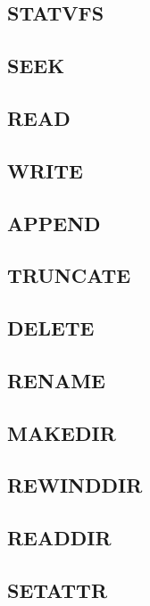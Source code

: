 \subsection{STATVFS}

\subsection{SEEK}

\subsection{READ}

\subsection{WRITE}

\subsection{APPEND}

\subsection{TRUNCATE}

\subsection{DELETE}

\subsection{RENAME}

\subsection{MAKEDIR}

\subsection{REWINDDIR}

\subsection{READDIR}

\subsection{SETATTR}

